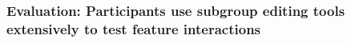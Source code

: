 
\subsubsection{Evaluation: Participants use subgroup editing tools extensively to test feature interactions}
\label{sec:results-evaluation}

